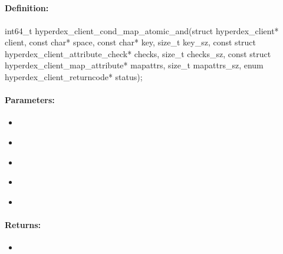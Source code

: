 \pagebreak
\subsection{}
\label{api:c:cond_map_atomic_and}


\paragraph{Definition:}
\begin{ccode}
int64_t hyperdex_client_cond_map_atomic_and(struct hyperdex_client* client,
        const char* space,
        const char* key, size_t key_sz,
        const struct hyperdex_client_attribute_check* checks, size_t checks_sz,
        const struct hyperdex_client_map_attribute* mapattrs, size_t mapattrs_sz,
        enum hyperdex_client_returncode* status);
\end{ccode}

\paragraph{Parameters:}
\begin{itemize}[noitemsep]
\item {}\\

\item {}\\

\item {}\\

\item {}\\

\item {}\\

\end{itemize}

\paragraph{Returns:}
\begin{itemize}[noitemsep]
\item {}\\

\end{itemize}

